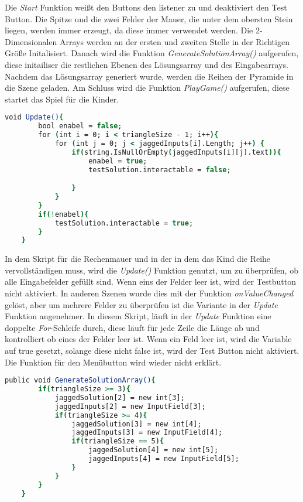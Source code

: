 Die \textit{Start} Funktion weißt den Buttons den listener zu und deaktiviert den Test Button. Die Spitze und die zwei Felder der Mauer, die unter dem obersten Stein liegen, werden immer erzeugt, da diese immer verwendet werden. Die 2-Dimensionalen Arrays werden an der ersten und zweiten Stelle in der Richtigen Größe Initalisiert. Danach wird die Funktion \textit{GenerateSolutionArray()} aufgerufen, diese initailiser die restlichen Ebenen des Lösungsarray und des Eingabearrays. Nachdem das Lösungsarray generiert wurde, werden die Reihen der Pyramide in die Szene geladen. Am Schluss wird die Funktion \textit{PlayGame()} aufgerufen, diese startet das Spiel für die Kinder.\\
\begin{lstlisting}[language=csh, caption={Triangle.cs Update-Funktion}]
	void Update(){
		bool enabel = false;
		for (int i = 0; i < triangleSize - 1; i++){
			for (int j = 0; j < jaggedInputs[i].Length; j++) {
				if(string.IsNullOrEmpty(jaggedInputs[i][j].text)){
					enabel = true;
					testSolution.interactable = false;

				}
			}
		}
		if(!enabel){
			testSolution.interactable = true;
		}
	}
\end{lstlisting}
In dem Skript für die Rechenmauer und in der in dem das Kind die Reihe vervollständigen muss, wird die \textit{Update()} Funktion genutzt, um zu überprüfen, ob alle Eingabefelder gefüllt sind. Wenn eins der Felder leer ist, wird der Testbutton nicht aktiviert. In anderen Szenen wurde dies mit der Funktion \textit{onValueChanged} gelöst, aber um mehrere Felder zu überprüfen ist die Variante in der \textit{Update} Funktion angenehmer. In diesem Skript, läuft in der \textit{Update} Funktion eine doppelte \textit{For}-Schleife durch, diese läuft für jede Zeile die Länge ab und kontrolliert ob eines der Felder leer ist. Wenn ein Feld leer ist, wird die  Variable auf true gesetzt, solange diese nicht false ist, wird der Test Button nicht aktiviert.\\
Die Funktion für den Menübutton wird wieder nicht erklärt.\\
\begin{lstlisting}[language=csh, caption={Triangle.cs GenerateSolutionArray-Funktion}]
	public void GenerateSolutionArray(){
		if(triangleSize >= 3){
			jaggedSolution[2] = new int[3];
			jaggedInputs[2] = new InputField[3];
			if(triangleSize >= 4){
				jaggedSolution[3] = new int[4];
				jaggedInputs[3] = new InputField[4];
				if(triangleSize == 5){
					jaggedSolution[4] = new int[5];
					jaggedInputs[4] = new InputField[5];
				}
			}
		}
	}
\end{lstlisting}

